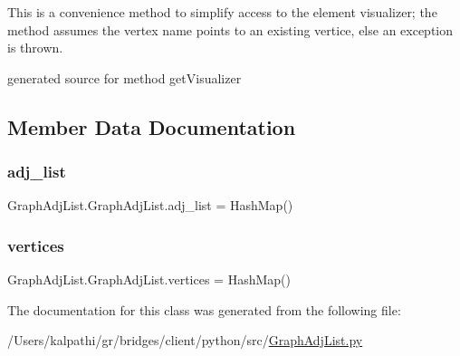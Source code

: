 This is a convenience method to simplify access to the element visualizer; the method assumes the vertex name points to an existing vertice, else an exception is thrown. 

\begin{DoxyVerb}generated source for method getVisualizer \end{DoxyVerb}
 

\subsection{Member Data Documentation}
\hypertarget{class_graph_adj_list_1_1_graph_adj_list_adf27f860d178d9d0f0aa3c3a6c45afe9}{}\label{class_graph_adj_list_1_1_graph_adj_list_adf27f860d178d9d0f0aa3c3a6c45afe9} 
\subsubsection{\texorpdfstring{adj\+\_\+list}{adj\_list}}
{\footnotesize\ttfamily Graph\+Adj\+List.\+Graph\+Adj\+List.\+adj\+\_\+list = Hash\+Map()\hspace{0.3cm}{\ttfamily [static]}}

\hypertarget{class_graph_adj_list_1_1_graph_adj_list_a47f4552a36c0fdc7d7599a7b5b47177d}{}\label{class_graph_adj_list_1_1_graph_adj_list_a47f4552a36c0fdc7d7599a7b5b47177d} 
\subsubsection{\texorpdfstring{vertices}{vertices}}
{\footnotesize\ttfamily Graph\+Adj\+List.\+Graph\+Adj\+List.\+vertices = Hash\+Map()\hspace{0.3cm}{\ttfamily [static]}}



The documentation for this class was generated from the following file\+:\begin{DoxyCompactItemize}
\item 
/\+Users/kalpathi/gr/bridges/client/python/src/\hyperlink{_graph_adj_list_8py}{Graph\+Adj\+List.\+py}\end{DoxyCompactItemize}
